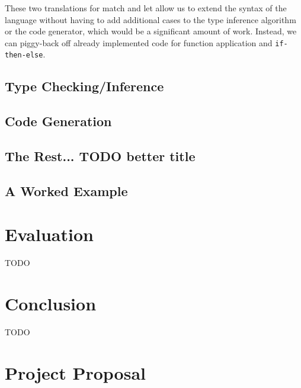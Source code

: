 \documentclass[12pt,a4paper,twoside,openright]{report}
\begin{document}
These two translations for match and let allow us to extend the syntax of the language without having to add additional cases to the type inference algorithm or the code generator, which would be a significant amount of work.
Instead, we can piggy-back off already implemented code for function application and {\tt if-then-else}.
\section{Type Checking/Inference}
\section{Code Generation}
\section{The Rest... TODO better title}
\section{A Worked Example}

\chapter{Evaluation}

TODO

\chapter{Conclusion}

TODO



\appendix

\chapter{Project Proposal}

% 
\end{document}

